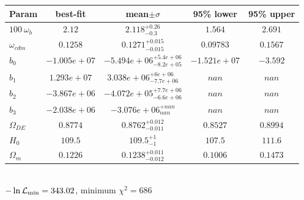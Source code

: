 \begin{tabular}{|l|c|c|c|c|} 
 \hline 
Param & best-fit & mean$\pm\sigma$ & 95\% lower & 95\% upper \\ \hline 
$100~\omega_{b }$ &$2.12$ & $2.118_{-0.3}^{+0.26}$ & $1.564$ & $2.691$ \\ 
$\omega_{cdm }$ &$0.1258$ & $0.1271_{-0.015}^{+0.015}$ & $0.09783$ & $0.1567$ \\ 
$b_{0 }$ &$-1.005e+07$ & $-5.494e+06_{-8.2e+05}^{+5.4e+06}$ & $-1.521e+07$ & $-3.592$ \\ 
$b_{1 }$ &$1.293e+07$ & $3.038e+06_{-7.7e+06}^{+6e+06}$ & $nan$ & $nan$ \\ 
$b_{2 }$ &$-3.867e+06$ & $-4.072e+05_{-6.6e+06}^{+7.7e+06}$ & $nan$ & $nan$ \\ 
$b_{3 }$ &$-2.038e+06$ & $-3.076e+06_{nan}^{+nan}$ & $nan$ & $nan$ \\ 
$\Omega_{DE}$ &$0.8774$ & $0.8762_{-0.011}^{+0.012}$ & $0.8527$ & $0.8994$ \\ 
$H_{0 }$ &$109.5$ & $109.5_{-1}^{+1}$ & $107.5$ & $111.6$ \\ 
$\Omega_{m }$ &$0.1226$ & $0.1238_{-0.012}^{+0.011}$ & $0.1006$ & $0.1473$ \\ 
\hline 
 \end{tabular} \\ 
$-\ln{\cal L}_\mathrm{min} =343.02$, minimum $\chi^2=686$ \\ 
